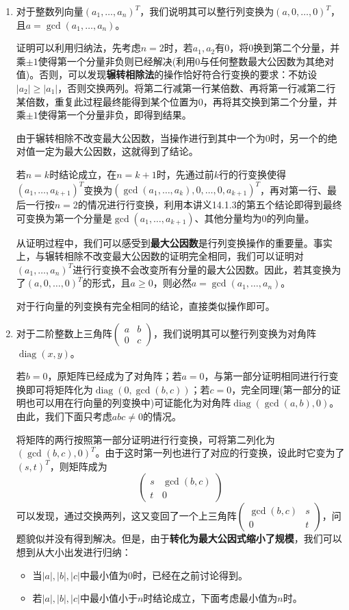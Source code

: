 \documentclass[a4paper,UTF8,fontset=windows,AutoFakeBold]{ctexart}
\DeclareMathOperator{\diag}{diag}
\newcommand*{\note}{\noindent *}
\begin{document}
\begin{enumerate}
    \item 对于整数列向量$(a_1,\dots,a_n)^T$，我们说明其可以整行列变换为$(a,0,\dots,0)^T$，且$a=\gcd(a_1,\dots,a_n)$。
    
    证明可以利用归纳法，先考虑$n=2$时，若$a_1,a_2$有0，将0换到第二个分量，并乘$\pm1$使得第一个分量非负则已经解决(利用0与任何整数最大公因数为其绝对值)。否则，可以发现\textbf{辗转相除法}的操作恰好符合行变换的要求：不妨设$|a_2|\ge|a_1|$，否则交换两列。将第二行减第一行某倍数、再将第一行减第二行某倍数，重复此过程最终能得到某个位置为0，再将其交换到第二个分量，并乘$\pm1$使得第一个分量非负，即得到结果。
    
    由于辗转相除不改变最大公因数，当操作进行到其中一个为0时，另一个的绝对值一定为最大公因数，这就得到了结论。

    若$n=k$时结论成立，在$n=k+1$时，先通过前$k$行的行变换使得$(a_1,\dots,a_{k+1})^T$变换为$(\gcd(a_1,\dots,a_k),0,\dots,0,a_{k+1})^T$，再对第一行、最后一行按$n=2$的情况进行行变换，利用本讲义14.1.3的第五个结论即得到最终可变换为第一个分量是$\gcd(a_1,\dots,a_{k+1})$、其他分量均为0的列向量。

    \note 从证明过程中，我们可以感受到\textbf{最大公因数}是行列变换操作的重要量。事实上，与辗转相除不改变最大公因数的证明完全相同，我们可以证明对$(a_1,\dots,a_n)^T$进行行变换不会改变所有分量的最大公因数。因此，若其变换为了$(a,0,\dots,0)^T$的形式，且$a\ge0$，则必然$a=\gcd(a_1,\dots,a_n)$。

    \note 对于行向量的列变换有完全相同的结论，直接类似操作即可。

    \item 对于二阶整数上三角阵$\begin{pmatrix}a&b\\0&c\end{pmatrix}$，我们说明其可以整行列变换为对角阵$\diag(x,y)$。
    
    若$b=0$，原矩阵已经成为了对角阵；若$a=0$，与第一部分证明相同进行行变换即可将矩阵化为$\diag(0,\gcd(b,c))$；若$c=0$，完全同理(第一部分的证明也可以用在行向量的列变换中)可证能化为对角阵$\diag(\gcd(a,b),0)$。由此，我们下面只考虑$abc\ne0$的情况。

    将矩阵的两行按照第一部分证明进行行变换，可将第二列化为$(\gcd(b,c),0)^T$。由于这时第一列也进行了对应的行变换，设此时它变为了$(s,t)^T$，则矩阵成为
    $$\begin{pmatrix}s&\gcd(b,c)\\t&0\end{pmatrix}$$
    可以发现，通过交换两列，这又变回了一个上三角阵$\begin{pmatrix}\gcd(b,c)&s\\0&t\end{pmatrix}$，问题貌似并没有得到解决。但是，由于\textbf{转化为最大公因式缩小了规模}，我们可以想到从大小出发进行归纳：
    \begin{itemize}
        \item 当$|a|,|b|,|c|$中最小值为0时，已经在之前讨论得到。
        \item 若$|a|,|b|,|c|$中最小值小于$n$时结论成立，下面考虑最小值为$n$时。
        

\end{itemize}
\end{enumerate}
\end{document}
